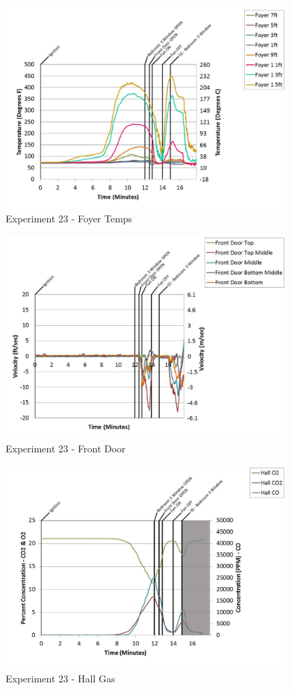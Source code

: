 \documentclass{article}
\begin{document}
\begin{appendices}
	\clearpage

	\begin{figure}[h!]
		\centering
		\includegraphics[height=3.05in]{0_Images/Results_Charts/Exp_23_Charts/FoyerTemps.pdf}
		\caption{Experiment 23 - Foyer Temps}
	\end{figure}
 

	\begin{figure}[h!]
		\centering
		\includegraphics[height=3.05in]{0_Images/Results_Charts/Exp_23_Charts/FrontDoor.pdf}
		\caption{Experiment 23 - Front Door}
	\end{figure}
 
	\clearpage

	\begin{figure}[h!]
		\centering
		\includegraphics[height=3.05in]{0_Images/Results_Charts/Exp_23_Charts/HallGas.pdf}
		\caption{Experiment 23 - Hall Gas}
	\end{figure}
 


\end{appendices}
\end{document}
